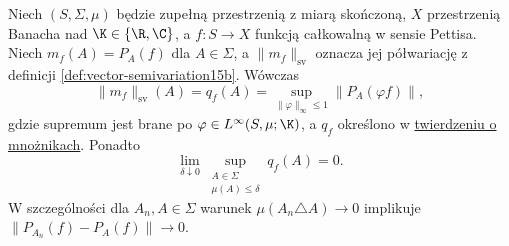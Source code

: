 \begin{twierdzenie}
\label{thm:pettis-semivariation15b}
Niech $(S,\Sigma,\mu)$ będzie zupełną przestrzenią z miarą
skończoną, $X$ przestrzenią Banacha nad $\K\in\{\R,\C\}$,
a $f:S\to X$ funkcją całkowalną w sensie Pettisa.
Niech $m_f(A)=P_A(f)$ dla $A\in\Sigma$, a
$\|m_f\|_{\mathrm{sv}}$ oznacza jej półwariację
z definicji \ref{def:vector-semivariation15b}.
Wówczas
\[
 \|m_f\|_{\mathrm{sv}}(A)=q_f(A)
 =\sup_{\|\varphi\|_\infty\le1}\|P_A(\varphi f)\|,
\]
gdzie supremum jest brane po $\varphi\in L^\infty(S,\mu;\K)$,
a $q_f$ określono w
\hyperref[thm:vector-integral-multipliers15b]{twierdzeniu o mnożnikach}.
Ponadto
\[
 \lim_{\delta\downarrow0}
 \sup_{\substack{A\in\Sigma\\\mu(A)\le\delta}}q_f(A)=0.
\]
W szczególności dla $A_n,A\in\Sigma$ warunek
$\mu(A_n\triangle A)\to0$ implikuje
$\|P_{A_n}(f)-P_A(f)\|\to0$.
\end{twierdzenie}
